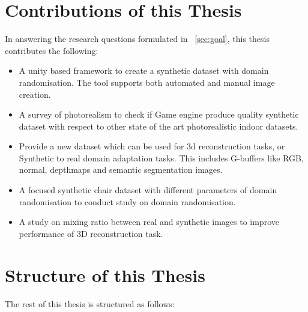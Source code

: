 
\section{Contributions of this Thesis}\label{sec:contributions}
In answering the research questions formulated in ~\ref{sec:goal}, this thesis contributes the following:

\begin{itemize}
    \item A unity based framework to create a synthetic dataset with domain randomisation.
    The tool supports both automated and manual image creation.
    \item A survey of photorealism to check if Game engine produce quality synthetic dataset with respect to other state of the art photorealistic indoor datasets.
    \item Provide a new dataset which can be used for 3d reconstruction tasks, or Synthetic to real domain adaptation tasks.
    This includes G-buffers like RGB, normal, depthmaps and semantic segmentation images.
    \item A focused synthetic chair dataset with different parameters of domain randomisation to conduct study on domain randomisation.
    \item A study on mixing ratio between real and synthetic images to improve performance of 3D reconstruction task.
\end{itemize}


\section{Structure of this Thesis}\label{sec:Structure of thesis}

The rest of this thesis is structured as follows:

